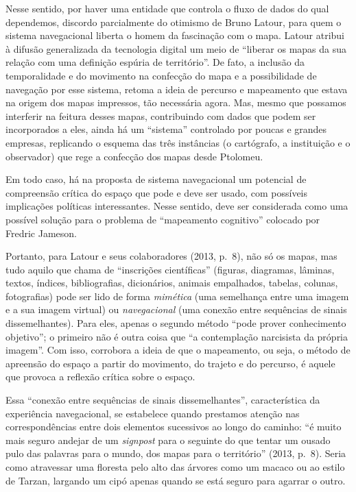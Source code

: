 Nesse sentido, por haver uma entidade que controla o fluxo de dados do
qual dependemos, discordo parcialmente do otimismo de Bruno Latour, para
quem o sistema navegacional liberta o homem da fascinação com o mapa.
Latour atribui à difusão generalizada da tecnologia digital um meio de
``liberar os mapas da sua relação com uma definição espúria de
território''. De fato, a inclusão da temporalidade e do movimento na
confecção do mapa e a possibilidade de navegação por esse sistema,
retoma a ideia de percurso e mapeamento que estava na origem dos mapas
impressos, tão necessária agora. Mas, mesmo que possamos interferir na
feitura desses mapas, contribuindo com dados que podem ser incorporados
a eles, ainda há um ``sistema'' controlado por poucas e grandes empresas,
replicando o esquema das três instâncias (o cartógrafo, a instituição e
o observador) que rege a confecção dos mapas desde Ptolomeu.

Em todo caso, há na proposta de sistema navegacional um potencial de
compreensão crítica do espaço que pode e deve ser usado, com possíveis
implicações políticas interessantes. Nesse sentido, deve ser considerada
como uma possível solução para o problema de ``mapeamento cognitivo''
colocado por Fredric Jameson.

Portanto, para Latour e seus colaboradores (2013, p.~8), não só os
mapas, mas tudo aquilo que chama de ``inscrições científicas'' (figuras,
diagramas, lâminas, textos, índices, bibliografias, dicionários, animais
empalhados, tabelas, colunas, fotografias) pode ser lido de forma
\emph{mimética} (uma semelhança entre uma imagem e a sua imagem virtual)
ou \emph{navegacional} (uma conexão entre sequências de sinais
dissemelhantes). Para eles, apenas o segundo método ``pode prover
conhecimento objetivo''; o primeiro não é outra coisa que ``a
contemplação narcisista da própria imagem''. Com isso, corrobora a ideia
de que o mapeamento, ou seja, o método de apreensão do espaço a partir
do movimento, do trajeto e do percurso, é aquele que provoca a reflexão
crítica sobre o espaço.

Essa ``conexão entre sequências de sinais dissemelhantes'',
característica da experiência navegacional, se estabelece quando
prestamos atenção nas correspondências entre dois elementos sucessivos
ao longo do caminho: ``é muito mais seguro andejar de um \emph{signpost}
para o seguinte do que tentar um ousado pulo das palavras para o mundo,
dos mapas para o território'' (2013, p.~8). Seria como atravessar uma
floresta pelo alto das árvores como um macaco ou ao estilo de Tarzan,
largando um cipó apenas quando se está seguro para agarrar o outro.

